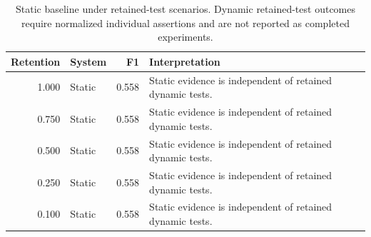 \begin{table}[!htbp]
\centering
\scriptsize
\begin{tabular}{rlrl}
\toprule
Retention & System & F1 & Interpretation \\
\midrule
1.000 & Static & 0.558 & Static evidence is independent of retained dynamic tests. \\
0.750 & Static & 0.558 & Static evidence is independent of retained dynamic tests. \\
0.500 & Static & 0.558 & Static evidence is independent of retained dynamic tests. \\
0.250 & Static & 0.558 & Static evidence is independent of retained dynamic tests. \\
0.100 & Static & 0.558 & Static evidence is independent of retained dynamic tests. \\
\bottomrule
\end{tabular}
\vspace{0.5em}
\caption{Static baseline under retained-test scenarios. Dynamic retained-test outcomes require normalized individual assertions and are not reported as completed experiments.}
\label{tab:weak-tests}
\end{table}
